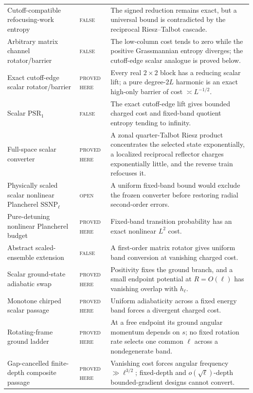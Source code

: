 \documentclass[11pt]{article}
\newcommand{\statusproved}{\textcolor{proved}{\textsc{proved here}}}
\newcommand{\statusopen}{\textcolor{open}{\textsc{open}}}
\newcommand{\statusfailed}{\textcolor{failed}{\textsc{false}}}
\theoremstyle{definition}
\theoremstyle{remark}
\begin{document}
\begin{longtable}{>{\raggedright\arraybackslash}p{}>{\raggedright\arraybackslash}p{}>{\raggedright\arraybackslash}p{}}
Cutoff-compatible refocusing-work entropy & \statusfailed & The signed reduction remains exact, but a universal bound is contradicted by the reciprocal Riesz--Talbot cascade. \\
Arbitrary matrix channel rotator/barrier & \statusfailed & The low-column cost tends to zero while the positive Grassmannian entropy diverges; the cutoff-edge scalar analogue is proved below. \\
Exact cutoff-edge scalar rotator/barrier & \statusproved & Every real $2\times2$ block has a reducing scalar lift; a pure degree-$2L$ harmonic is an exact high-only barrier of cost $\asymp L^{-1/2}$. \\
Scalar $\mathrm{PSR}_1$ & \statusfailed & The exact cutoff-edge lift gives bounded charged cost and fixed-band quotient entropy tending to infinity. \\
Full-space scalar converter & \statusproved & A zonal quarter-Talbot Riesz product concentrates the selected state exponentially, a localized reciprocal reflector charges exponentially little, and the reverse train refocuses it. \\
Physically scaled scalar nonlinear Plancherel $\mathrm{SSNP}_\ell$ & \statusopen & A uniform fixed-band bound would exclude the frozen converter before restoring radial second-order errors. \\
Pure-detuning nonlinear Plancherel budget & \statusproved & Fixed-band transition probability has an exact nonlinear $L^2$ cost. \\
Abstract scaled-ensemble extension & \statusfailed & A first-order matrix rotator gives uniform band conversion at vanishing charged cost. \\
Scalar ground-state adiabatic swap & \statusproved & Positivity fixes the ground branch, and a small endpoint potential at $R=O(\ell)$ has vanishing overlap with $h_\ell$. \\
Monotone chirped scalar passage & \statusproved & Uniform adiabaticity across a fixed energy band forces a divergent charged cost. \\
Rotating-frame ground ladder & \statusproved & At a free endpoint its ground angular momentum depends on $s$; no fixed rotation rate selects one common $\ell$ across a nondegenerate band. \\
Gap-cancelled finite-depth composite passage & \statusproved & Vanishing cost forces angular frequency $\gg\ell^{3/2}$; fixed-depth and $o(\sqrt\ell)$-depth bounded-gradient designs cannot convert. \\

\end{longtable}
\end{document}
